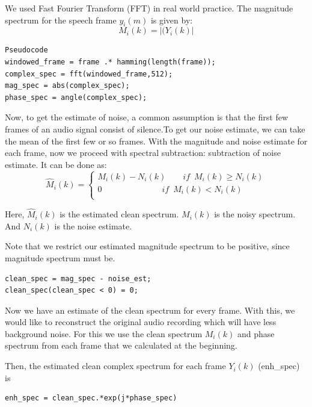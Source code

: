 We used Fast Fourier Transform (FFT) in real world practice.
The magnitude spectrum for the speech frame $y_i(m)$ is given by:
\begin{equation}
M_i(k) = |(Y_i(k)|
\end{equation}


\vspace{9mm}
\begin{lstlisting}
Pseudocode
windowed_frame = frame .* hamming(length(frame));
complex_spec = fft(windowed_frame,512); 
mag_spec = abs(complex_spec);
phase_spec = angle(complex_spec);
\end{lstlisting}


Now, to get the estimate of noise, a common assumption is that the first few frames of an audio signal consist of silence.To get our noise estimate, we can take the mean of the first few or so frames. With the magnitude and noise estimate for each frame, now we proceed with spectral subtraction: subtraction of noise estimate. It can be done as:
\begin{equation}
\hat{M}_i(k) =
\begin{cases}
	M_i(k) - N_i(k)\qquad if\enspace M_i(k) \geq N_i(k)\\
	0 \hspace{3cm} if\enspace M_i(k) < N_i(k)\\
\end{cases}
\end{equation}


Here, $\hat{M}_i(k)$ is the estimated clean spectrum. $M_i(k)$ is the noisy spectrum. And $N_i(k)$ is the noise estimate.

Note that we restrict our estimated magnitude spectrum to be positive, since magnitude spectrum must be.

\begin{lstlisting}
clean_spec = mag_spec - noise_est;
clean_spec(clean_spec < 0) = 0;
\end{lstlisting}

Now we have an estimate of the clean spectrum for every frame. With this, we would like to reconstruct the original audio recording which will  have less background noise. For this we use the clean spectrum $M_i(k)$ and phase spectrum from each frame that we calculated at the beginning.

Then, the estimated clean complex spectrum for each frame $Y_i(k)$ (enh\_spec) is


\begin{lstlisting}
enh_spec = clean_spec.*exp(j*phase_spec)

\end{lstlisting}



